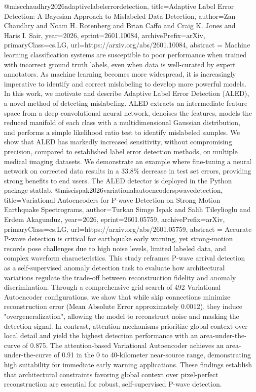 {}@misc{chaudhry2026adaptivelabelerrordetection,
      title={Adaptive Label Error Detection: A Bayesian Approach to Mislabeled Data Detection}, 
      author={Zan Chaudhry and Noam H. Rotenberg and Brian Caffo and Craig K. Jones and Haris I. Sair},
      year={2026},
      eprint={2601.10084},
      archivePrefix={arXiv},
      primaryClass={cs.LG},
      url={https://arxiv.org/abs/2601.10084},
      abstract = {Machine learning classification systems are susceptible to poor performance when trained with incorrect ground truth labels, even when data is well-curated by expert annotators. As machine learning becomes more widespread, it is increasingly imperative to identify and correct mislabeling to develop more powerful models. In this work, we motivate and describe Adaptive Label Error Detection (ALED), a novel method of detecting mislabeling. ALED extracts an intermediate feature space from a deep convolutional neural network, denoises the features, models the reduced manifold of each class with a multidimensional Gaussian distribution, and performs a simple likelihood ratio test to identify mislabeled samples. We show that ALED has markedly increased sensitivity, without compromising precision, compared to established label error detection methods, on multiple medical imaging datasets. We demonstrate an example where fine-tuning a neural network on corrected data results in a 33.8\% decrease in test set errors, providing strong benefits to end users. The ALED detector is deployed in the Python package statlab.}
}@misc{ispak2026variationalautoencoderspwavedetection,
      title={Variational Autoencoders for P-wave Detection on Strong Motion Earthquake Spectrograms}, 
      author={Turkan Simge Ispak and Salih Tileylioglu and Erdem Akagunduz},
      year={2026},
      eprint={2601.05759},
      archivePrefix={arXiv},
      primaryClass={cs.LG},
      url={https://arxiv.org/abs/2601.05759},
      abstract = {Accurate P-wave detection is critical for earthquake early warning, yet strong-motion records pose challenges due to high noise levels, limited labeled data, and complex waveform characteristics. This study reframes P-wave arrival detection as a self-supervised anomaly detection task to evaluate how architectural variations regulate the trade-off between reconstruction fidelity and anomaly discrimination. Through a comprehensive grid search of 492 Variational Autoencoder configurations, we show that while skip connections minimize reconstruction error (Mean Absolute Error approximately 0.0012), they induce "overgeneralization", allowing the model to reconstruct noise and masking the detection signal. In contrast, attention mechanisms prioritize global context over local detail and yield the highest detection performance with an area-under-the-curve of 0.875. The attention-based Variational Autoencoder achieves an area-under-the-curve of 0.91 in the 0 to 40-kilometer near-source range, demonstrating high suitability for immediate early warning applications. These findings establish that architectural constraints favoring global context over pixel-perfect reconstruction are essential for robust, self-supervised P-wave detection.}
}
